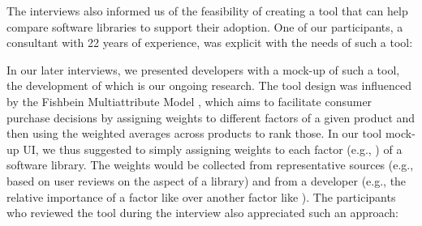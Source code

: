 The interviews also informed us of the feasibility of creating a tool that can help compare software libraries to support their adoption. One of our participants, a consultant with 22 years of experience, was explicit with the needs of such a tool: 

In our later interviews, we presented developers with a mock-up of such a tool, the development of which is our ongoing research. The tool design was influenced by the Fishbein Multiattribute Model \cite{fishbein1967attitude}, which aims to facilitate consumer purchase decisions by assigning weights to different factors of a given product and then using the weighted averages across products to rank those. In our tool mock-up UI, we thus suggested to simply assigning weights to each factor (e.g., ) of a software library. The weights would be collected from representative sources (e.g., based on user reviews on the  aspect of a library) and from a developer (e.g., the relative importance of a factor like  over another factor like ).
The participants who reviewed the tool during the interview also appreciated such an approach: 

